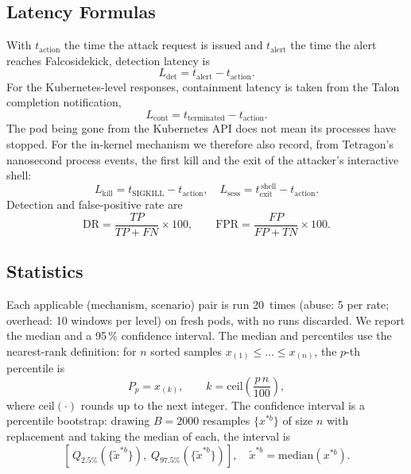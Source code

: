 \documentclass[10pt,conference]{IEEEtran}
\begin{document}
\subsection{Latency Formulas}
With $t_\text{action}$ the time the attack request is issued and $t_\text{alert}$ the time the alert reaches Falcosidekick, detection latency is
\begin{equation}
L_\text{det}=t_\text{alert}-t_\text{action}.
\end{equation}
For the Kubernetes-level responses, containment latency is taken from the Talon completion notification,
\begin{equation}
L_\text{cont}=t_\text{terminated}-t_\text{action}.
\end{equation}
The pod being gone from the Kubernetes API does not mean its processes have stopped. For the in-kernel mechanism we therefore also record, from Tetragon's nanosecond process events, the first kill and the exit of the attacker's interactive shell:
\begin{equation}
L_\text{kill}=t_\text{SIGKILL}-t_\text{action},\quad
L_\text{sess}=t_\text{exit}^{\,\text{shell}}-t_\text{action}.
\end{equation}
Detection and false-positive rate are
\begin{equation}
\mathrm{DR}=\frac{TP}{TP+FN}\times100,\qquad
\mathrm{FPR}=\frac{FP}{FP+TN}\times100.
\end{equation}

\subsection{Statistics}
Each applicable (mechanism, scenario) pair is run 20~times (abuse: 5 per rate; overhead: 10 windows per level) on fresh pods, with no runs discarded. We report the median and a 95\,\% confidence interval. The median and percentiles use the nearest-rank definition: for $n$ sorted samples $x_{(1)}\le\dots\le x_{(n)}$, the $p$-th percentile is
\begin{equation}
P_p = x_{(k)},\qquad k=\mathrm{ceil}\!\left(\frac{p\,n}{100}\right),
\end{equation}
where $\mathrm{ceil}(\cdot)$ rounds up to the next integer.
The confidence interval is a percentile bootstrap: drawing $B=2000$ resamples $\{x^{*b}\}$ of size $n$ with replacement and taking the median of each, the interval is
\begin{equation}
\left[\,Q_{2.5\%}\!\left(\{\tilde{x}^{*b}\}\right),\; Q_{97.5\%}\!\left(\{\tilde{x}^{*b}\}\right)\right],\quad \tilde{x}^{*b}=\mathrm{median}(x^{*b}).
\end{equation}
\end{document}
